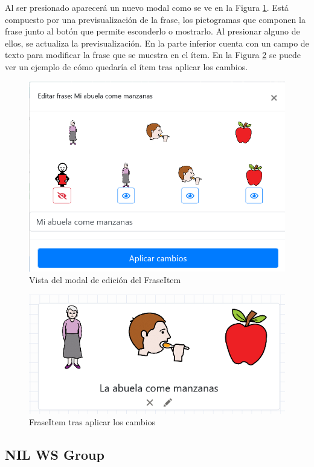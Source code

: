 Al ser presionado aparecerá un nuevo modal como se ve en la Figura \ref{fig:modaleditarfraseitem}. Está compuesto por una previsualización de la frase, los pictogramas que componen la frase junto al botón que permite esconderlo o mostrarlo. Al presionar alguno de ellos, se actualiza la previsualización. En la parte inferior cuenta con un campo de texto para modificar la frase que se muestra en el ítem. En la Figura \ref{fig:fraseitemmidificada} se puede ver un ejemplo de cómo quedaría el ítem tras aplicar los cambios. 

\begin{figure}[h!]
	\centering
	\includegraphics[width=0.7\linewidth]{Imagenes/Bitmap/modalEditarFraseItem}
	\caption{Vista del modal de edición del FraseItem}
	\label{fig:modaleditarfraseitem}
\end{figure}

\begin{figure}[h!]
	\centering
	\includegraphics[width=0.7\linewidth]{Imagenes/Bitmap/fraseItemMidificada}
	\caption{FraseItem tras  aplicar los cambios}
	\label{fig:fraseitemmidificada}
\end{figure}


\subsection{NIL WS Group}
\label{cap5:sec:nilgroup}

